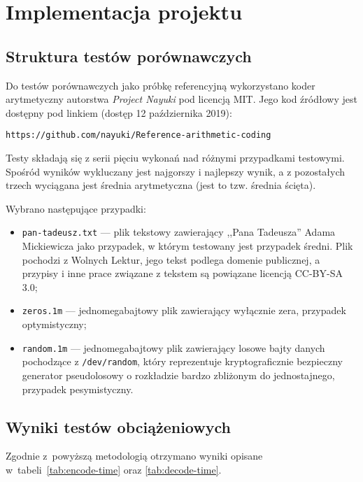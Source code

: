 \documentclass[../../praca.tex]{subfiles}
\begin{document}
\chapter{Implementacja projektu}

\section{Struktura testów porównawczych}

Do testów porównawczych jako próbkę referencyjną
wykorzystano koder arytmetyczny autorstwa \emph{Project Nayuki}
pod licencją MIT. Jego kod źródłowy jest dostępny pod linkiem (dostęp
12 października 2019):

\begin{center}
\verb|https://github.com/nayuki/Reference-arithmetic-coding|
\end{center}

Testy składają się z serii pięciu wykonań nad różnymi przypadkami
testowymi. Spośród wyników wykluczany jest najgorszy i najlepszy
wynik, a z pozostałych trzech wyciągana jest średnia arytmetyczna
(jest to tzw. średnia ścięta).

Wybrano następujące przypadki:
\begin{itemize}
  \item \texttt{pan-tadeusz.txt} --- plik tekstowy zawierający
    ,,Pana Tadeusza'' Adama Mickiewicza jako przypadek, w którym
    testowany jest przypadek średni. Plik pochodzi z Wolnych Lektur,
    jego tekst podlega domenie publicznej, a przypisy i inne
    prace związane z tekstem są powiązane licencją CC-BY-SA 3.0;
  \item \texttt{zeros.1m} --- jednomegabajtowy plik zawierający
    wyłącznie zera, przypadek optymistyczny;
  \item \texttt{random.1m} --- jednomegabajtowy plik zawierający 
    losowe bajty danych pochodzące z \texttt{/dev/random}, który
    reprezentuje kryptograficznie bezpieczny generator pseudolosowy
    o rozkładzie bardzo zbliżonym do jednostajnego, przypadek
    pesymistyczny.
\end{itemize}

\section{Wyniki testów obciążeniowych}

Zgodnie z~powyższą metodologią otrzymano wyniki opisane 
w~tabeli~\ref{tab:encode-time} oraz \ref{tab:decode-time}.
\end{document}
